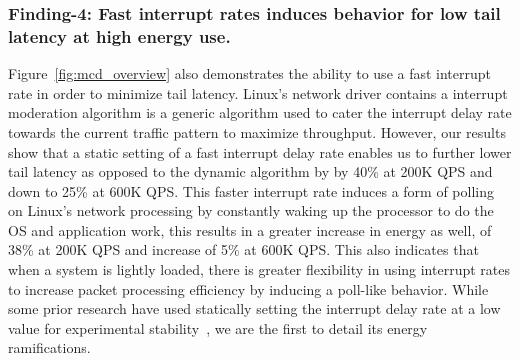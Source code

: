 \subsubsection{Finding-4: Fast interrupt rates induces behavior for low tail latency at high energy use.} \label{sec:f4} Figure~\ref{fig:mcd_overview} also demonstrates the ability to use a fast interrupt rate in order to minimize tail latency. Linux's network driver contains a interrupt moderation algorithm is a generic algorithm used to cater the interrupt delay rate towards the current traffic pattern to maximize throughput. However, our results show that a static setting of a fast interrupt delay rate enables us to further lower tail latency as opposed to the dynamic algorithm by by 40\% at 200K QPS and down to 25\% at 600K QPS. This faster interrupt rate induces a form of polling on Linux's network processing by constantly waking up the processor to do the OS and application work, this results in a greater increase in energy as well, of 38\% at 200K QPS and increase of 5\% at 600K QPS. This also indicates that when a system is lightly loaded, there is greater flexibility in using interrupt rates to increase packet processing efficiency by inducing a poll-like behavior. While some prior research have used statically setting the interrupt delay rate at a low value for experimental stability~\cite{arrakis, shenango}, we are the first to detail its energy ramifications.





